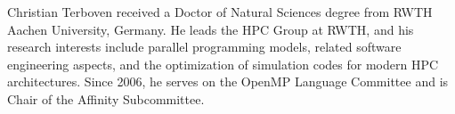\begin{IEEEbiography}{Christian Terboven}
received a Doctor of Natural Sciences degree from RWTH Aachen University,
Germany. He leads the HPC Group at RWTH, and his research interests include
parallel programming models, related software engineering aspects, and the
optimization of simulation codes for modern HPC architectures. Since 2006, he
serves on the OpenMP Language Committee and is Chair of the Affinity
Subcommittee.
\end{IEEEbiography}
